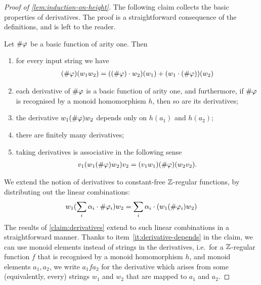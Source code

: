 \begin{proof}[Proof of \cref{lem:induction-on-height}]
The following claim collects the basic properties of derivatives. The proof is a straightforward consequence of the definitions, and is left to the reader.  
\begin{claim}\label{claim:derivatives}
    Let $\#{\varphi}$ be a basic function of arity one. Then
    \begin{enumerate}
        \item \label{it:derivative-add} for every input string we have
         \begin{align*}
(\#{\varphi})(w_1 w_2) = ((\#{\varphi}) \cdot w_2)(w_1) + (w_1 \cdot (\#{\varphi}))(w_2)
\end{align*}
        \item \label{it:derivative-homo} each derivative of $\#{\varphi}$ is a basic function of arity one, and furthermore, if $\#{\varphi}$ is recognised by a monoid homomorphism $h$, then so are  its derivatives;
                \item \label{it:derivative-depends} the derivative $w_1(\#{\varphi}) w_2$ depends only on $h(a_1)$ and $h(a_2)$;
                \item \label{it:derivative-finite} there are finitely many derivatives;
        \item  \label{it:derivative-associative} taking derivatives is associative in the following sense
        \begin{align*}
        v_1 (w_1 (\#{\varphi}) w_2) v_2 = (v_1 w_1) (\#{\varphi}) (w_2 v_2).
        \end{align*}
    \end{enumerate}
\end{claim}


We extend the notion of derivatives to constant-free ${\mathbb Z}$-regular functions,  by distributing out the linear combinations:
\begin{align*}
w_1(\sum_i \alpha_i \cdot  \#{\varphi_i}) w_2 = \sum_i \alpha_i \cdot (w_1(\#{\varphi_i}) w_2)
\end{align*} 
The results of \cref{claim:derivatives} extend to such  linear combinations in a straightforward manner. Thanks to item~\ref{it:derivative-depends} in the claim, we can use monoid elements instead of strings in the derivatives, i.e.~for a ${\mathbb Z}$-regular function $f$ that is recognised by a monoid homomorphism $h$, and monoid elements $a_1, a_2$, we write $a_1 f a_2$ for the derivative which arises from some (equivalently, every) strings $w_1$ and $w_2$ that are mapped to $a_1$ and $a_2$. 



\end{proof}
